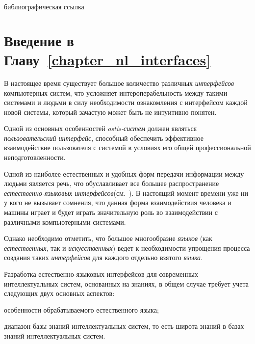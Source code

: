 \begin{SCn}
    \bigskip

	\begin{scnrelfromlist}{библиографическая ссылка}
	\end{scnrelfromlist}
\end{SCn}

\bigskip

\section*{Введение в Главу~\ref{chapter_nl_interfaces}}

В настоящее время существует большое количество различных \textit{интерфейсов} компьютерных систем, что усложняет интероперабельность между такими системами и людьми в силу необходимости ознакомления с интерфейсом каждой новой системы, который зачастую может быть не интуитивно понятен.

Одной из основных особенностей \textit{ostis-систем} должен являться \textit{пользовательский интерфейс}, способный обеспечить эффективное взаимодействие пользователя с системой в условиях его общей профессиональной неподготовленности.

Одной из наиболее естественных и удобных форм передачи информации между людьми является речь, что обуславливает все большее распространение \textit{естественно-языковых интерфейсов}(см.~).
В настоящий момент времени уже ни у кого не вызывает сомнения, что данная форма взаимодействия человека и машины играет и будет играть значительную роль во взаимодействии с различными компьютерными системами.

Однако необходимо отметить, что большое многообразие \textit{языков} (как \textit{естественных}, так и \textit{искусственных}) ведет к необходимости упрощения процесса создания таких \textit{интерфейсов} для каждого отдельно взятого \textit{языка}.

Разработка естественно-языковых интерфейсов для современных интеллектуальных систем, основанных на знаниях, в общем случае требует учета следующих двух основных аспектов:
\begin{textitemize}
	\item особенности обрабатываемого естественного языка;
	\item диапазон базы знаний интеллектуальных систем, то есть широта знаний в базах знаний интеллектуальных систем.
\end{textitemize}

